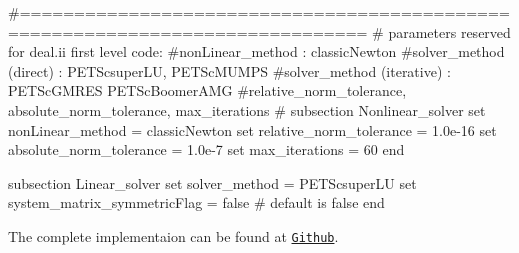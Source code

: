 \begin{DoxyCode}
                    
\textcolor{preprocessor}{#==============================================================================}
\textcolor{preprocessor}{# parameters reserved for deal.ii first level code:}
\textcolor{preprocessor}{#nonLinear\_method : classicNewton}
\textcolor{preprocessor}{#solver\_method (direct) : PETScsuperLU, PETScMUMPS}
\textcolor{preprocessor}{#solver\_method (iterative) : PETScGMRES PETScBoomerAMG}
\textcolor{preprocessor}{#relative\_norm\_tolerance, absolute\_norm\_tolerance, max\_iterations}
\textcolor{preprocessor}{#}
subsection Nonlinear\_solver
        \textcolor{keyword}{set} nonLinear\_method = classicNewton
        \textcolor{keyword}{set} relative\_norm\_tolerance = 1.0e-16
        \textcolor{keyword}{set} absolute\_norm\_tolerance = 1.0e-7
        \textcolor{keyword}{set} max\_iterations = 60
end
                        
subsection Linear\_solver
        \textcolor{keyword}{set} solver\_method = PETScsuperLU
        \textcolor{keyword}{set} system\_matrix\_symmetricFlag = \textcolor{keyword}{false} # \textcolor{keywordflow}{default} is \textcolor{keyword}{false}
end
\end{DoxyCode}
  

 

  The complete implementaion can be found at \href{https://github.com/mechanoChem/mechanoChemFEM/tree/example/Example3%20Battery%20model%20at%20particle%20scale}{\tt Github}. 